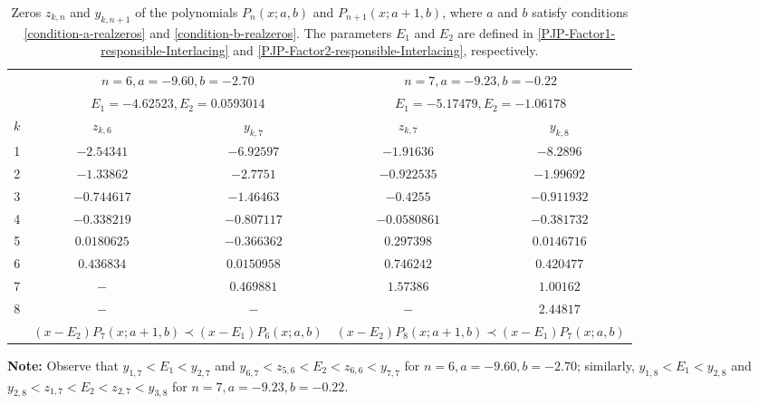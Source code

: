\documentclass[final,3p,times,12pt]{elsarticle}
\numberwithin{equation}{section}  %
\begin{document}
	
	
	\begin{table}[H]
	\centering
	\caption{Zeros $z_{k,n}$ and $y_{k,n+1}$ of the polynomials $P_{n}(x;a,b)$ and $P_{n+1}(x;a+1,b)$, where $a$ and $b$ satisfy conditions \eqref{condition-a-realzeros} and \eqref{condition-b-realzeros}. The parameters $E_1$ and $E_2$ are defined in \eqref{PJP-Factor1-responsible-Interlacing} and \eqref{PJP-Factor2-responsible-Interlacing}, respectively.}
	\label{tab5:Interlacingzeros2_PseudoJacobi}
	\footnotesize 
	\setlength{\tabcolsep}{12pt} 
	\begin{tabular}{@{}c cc | cc@{}}
		\toprule
		
		\addlinespace[2pt]
		& \multicolumn{2}{c|}{$n=6, a=-9.60, b=-2.70$} & \multicolumn{2}{c}{$n=7, a=-9.23, b=-0.22$} \\
		& \multicolumn{2}{c|}{$E_1 = -4.62523, E_2=0.0593014$} & \multicolumn{2}{c}{$E_1=-5.17479, E_2=-1.06178$} \\
		\midrule
		$k$ & $z_{k,6}$ & $y_{k,7}$ & $z_{k,7}$ & $y_{k,8}$ \\
		\midrule
		
		1 & $-2.54341$ & $-6.92597$ & $-1.91636$ & $-8.2896$ \\
		2 & $-1.33862$ & $-2.7751$ & $-0.922535$ & $-1.99692$ \\
		3 & $-0.744617$ & $-1.46463$ & $-0.4255$ & $-0.911932$ \\
		4 & $-0.338219$ & $-0.807117$ & $-0.0580861$ & $-0.381732$ \\
		5 & $0.0180625$ & $-0.366362$ & $0.297398$ & $0.0146716$ \\
		6 & $0.436834$ & $0.0150958$ & $0.746242$ & $0.420477$ \\
		7 & $-$ & $0.469881$ & $1.57386$ & $1.00162$ \\
		8 & $-$ & $-$ & $-$ & $2.44817$ \\
		\midrule
		& \multicolumn{2}{c|}{$(x-E_2)P_{7}(x;a+1,b)\prec (x-E_1) P_{6}(x;a,b)$} & \multicolumn{2}{c}{$(x-E_2)P_{8}(x;a+1,b)\prec (x-E_1) P_{7}(x;a,b)$} \\
		\bottomrule
		
	\end{tabular}
	
	\vspace{0.2cm}
	\begin{minipage}{0.9\textwidth}
		\footnotesize
		\textbf{Note:} Observe that $y_{1,7}<E_1 < y_{2,7}$ and $y_{6,7}<z_{5,6}<E_2< z_{6,6}<y_{7,7}$ for $n=6, a=-9.60, b=-2.70$; similarly, $y_{1,8}<E_1<y_{2,8}$ and $y_{2,8}<z_{1,7}<E_2 < z_{2,7}<y_{3,8}$ for $n=7, a=-9.23, b=-0.22$.
	\end{minipage}
	\end{table}	
	
\end{document}
